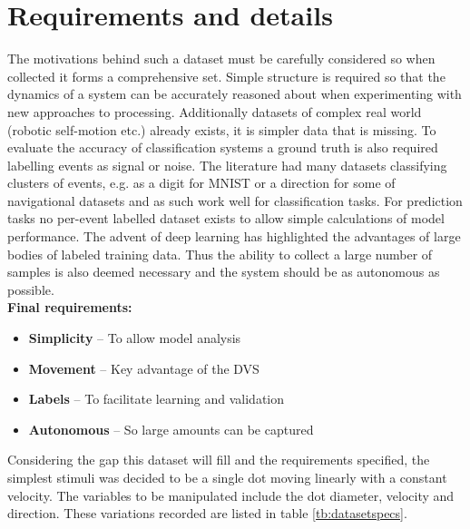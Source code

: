 \section{Requirements and details}
The motivations behind such a dataset must be carefully considered so when collected it forms a comprehensive set.
Simple structure is required so that the dynamics of a system can be accurately reasoned about when experimenting with new approaches to processing. 
Additionally datasets of complex real world (robotic self-motion etc.) already exists, it is simpler data that is missing.
To evaluate the accuracy of classification systems a ground truth is also required labelling events as signal or noise. 
The literature had many datasets classifying clusters of events, e.g. as a digit for MNIST or a direction for some of navigational datasets and as such work well for classification tasks.
For prediction tasks no per-event labelled dataset exists to allow simple calculations of model performance.  
The advent of deep learning has highlighted the advantages of large bodies of labeled training data. 
Thus the ability to collect a large number of samples is also deemed necessary and the system should be as autonomous as possible. \\ 
\textbf{Final requirements:}

\begin{itemize}
    \itemsep-0.5em
    \item \textbf{Simplicity} -- To allow model analysis
    \item \textbf{Movement} -- Key advantage of the DVS
    \item \textbf{Labels} -- To facilitate learning and validation
    \item \textbf{Autonomous} -- So large amounts can be captured
\end{itemize}



Considering the gap this dataset will fill and the requirements specified, the simplest stimuli was decided to be a single dot moving linearly with a constant velocity. 
The variables to be manipulated include the dot diameter, velocity and direction. 
These variations recorded are listed in table \ref{tb:datasetspecs}.

